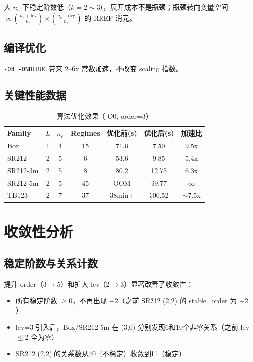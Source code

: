 \documentclass[12pt,a4paper]{article}
\begin{document}
大 $n_e$ 下稳定阶数低（$k=2\sim3$），展开成本不是瓶颈；瓶颈转向变量空间
$\propto \binom{n_e+\text{lev}}{n_e} \times \binom{n_e+\text{deg}}{n_e}$ 的 RREF 消元。

\subsection{编译优化}
\texttt{-O3 -DNDEBUG} 带来 2--6x 常数加速，不改变 scaling 指数。

\subsection{关键性能数据}

\begin{table}[h]
\centering
\caption{算法优化效果（-O0, order=3）}
\begin{tabular}{lcccccc}
\toprule
Family & $L$ & $n_e$ & Regimes & 优化前(s) & 优化后(s) & 加速比 \\
\midrule
Box    & 1 & 4 & 15 & 71.6  & 7.50   & 9.5x \\
SR212  & 2 & 5 & 6  & 53.6  & 9.85   & 5.4x \\
SR212-3m & 2 & 5 & 8 & 80.2 & 12.75 & 6.3x \\
SR212-5m & 2 & 5 & 45 & OOM  & 69.77  & $\infty$ \\
TB123  & 2 & 7 & 37 & 38min+ & 300.52 & $\sim$7.5x \\
\bottomrule
\end{tabular}
\end{table}

\section{收敛性分析}

\subsection{稳定阶数与关系计数}

提升 order（3$\to$5）和扩大 lev（2$\to$3）显著改善了收敛性：
\begin{itemize}[nosep]
    \item 所有稳定阶数 $\ge 0$，不再出现 $-2$（之前 SR212 (2,2) 的 stable\_order 为 $-2$）
    \item lev=3 引入后，Box/SR212-5m 在 (3,0) 分别发现6和10个非零关系（之前 lev$\le$2 全为零）
    \item SR212 (2,2) 的关系数从40（不稳定）收敛到11（稳定）
\end{itemize}
\end{document}
